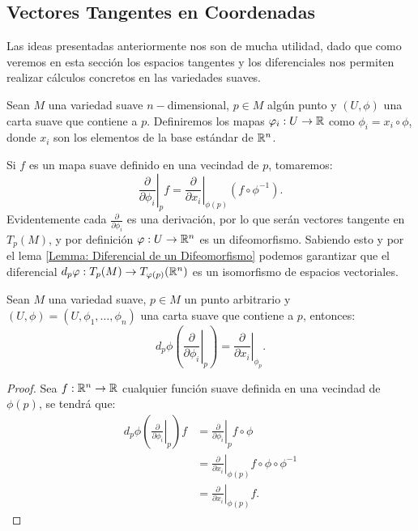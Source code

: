 \subsection{Vectores Tangentes en Coordenadas}\label{Subsección: Espacios Tangentes en Coordenadas}
Las ideas presentadas anteriormente nos son de mucha utilidad, dado que como veremos en esta sección los espacios tangentes y los diferenciales nos permiten realizar cálculos concretos en las variedades suaves.

Sean $M$ una variedad suave $n-$dimensional, $p \in M$ algún punto y $(U,\phi)$ una carta suave que contiene a $p$. Definiremos los mapas $\varphi_i: U \to \mathbb{R}$ como $\phi_{i} = x_i \circ \phi$, donde $x_i$ son los elementos de la base estándar de $\mathbb{R}^n$.

Si $f$ es un mapa suave definido en una vecindad de $p$, tomaremos:
\[
	\left.
	\frac{\partial}{\partial \phi_i}
	\right|_{p} f
	=
	\left.
	\frac{\partial}{\partial x_i}
	\right|_{\phi(p)}
	\left( f \circ \phi^{-1} \right).
\]
Evidentemente cada $\frac{\partial}{\partial \phi_i}$ es una derivación, por lo que serán vectores tangente en $T_p(M)$, y por definición $\varphi: U \to \mathbb{R}^n$ es un difeomorfismo. Sabiendo esto y por el lema \ref{Lemma: Diferencial de un Difeomorfismo} podemos garantizar que el diferencial $d_p\varphi: T_p(M) \to T_{\varphi(p)}(\mathbb{R}^n)$ es un isomorfismo de espacios vectoriales.

\begin{lemma}\label{Lemma: Definicion Vector Coordenado}
	Sean $M$ una variedad suave, $p \in M$ un punto arbitrario y $(U,\phi) = (U, \phi_1, \dots, \phi_n)$ una carta suave que contiene a $p$, entonces:
	\[
		d_p\phi \left( \left. \frac{\partial }{\partial \phi_i}\right|_{p}\right)
		= \left. \frac{\partial}{\partial x_i} \right|_{\phi_p}.
	\]
\end{lemma}

\begin{proof}
	Sea $f: \mathbb{R}^n \to \mathbb{R}$ cualquier función suave definida en una vecindad de $\phi(p)$, se tendrá que:
	\begin{align*}
		d_p\phi \left( \left. \frac{\partial}{\partial \phi_i} \right|_{p} \right) f
		 & = \left. \frac{\partial}{\partial \phi_i} \right|_{p}
		f \circ \phi                                                  \\
		 & = \left. \frac{\partial}{\partial x_i} \right|_{\phi(p)}
		f \circ \phi \circ \phi^{-1}                                  \\
		 & = \left. \frac{\partial}{\partial x_i}\right|_{\phi(p)} f.
	\end{align*}
\end{proof}


